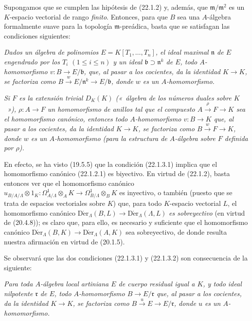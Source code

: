 \begin{remark}[22.1.3]
\label{0.22.1.3-fr}
Supongamos que se cumplen las hipótesis de (22.1.2) y, además, que
$\mathfrak m/\mathfrak m^2$ es un $K$-espacio vectorial de rango \emph{finito}.
Entonces, para que $B$ sea una $A$-álgebra formalmente suave para la topología
$\mathfrak m$-preádica, basta que se satisfagan las condiciones siguientes:

\begin{env}[22.1.3.1]
\label{0.22.1.3.1-fr}
\itshape Dados un álgebra de polinomios $E=K[T_1,\ldots,T_n]$, el ideal maximal
$\mathfrak n$ de $E$ engendrado por los $T_i$ $(1\leqslant i\leqslant n)$ y
un ideal $\mathfrak b\supset\mathfrak n^k$ de $E$, todo
$A$-homomorfismo $v:B\to E/\mathfrak b$, que, al pasar a los cocientes,
da la identidad $K\to K$, se factoriza como
$B\xrightarrow{w}E/\mathfrak n^k\to E/\mathfrak b$,
donde $w$ es un $A$-homomorfismo.
\end{env}

\begin{env}[22.1.3.2]
\label{0.22.1.3.2-fr}
\itshape Si $F$ es la extensión trivial $D_K(K)$ \textup{(«~álgebra de los números duales
sobre $K$~»)}, $\rho:A\to F$ un homomorfismo de anillos tal que el compuesto
$A\xrightarrow{\rho}F\to K$ sea el homomorfismo canónico, entonces todo
$A$-homomorfismo $v:B\to K$ que, al pasar a los cocientes, da la
identidad $K\to K$, se factoriza como
$B\xrightarrow{w}F\to K$,
donde $w$ es un $A$-homomorfismo (para la estructura de $A$-álgebra
sobre $F$ definida por $\rho$).
\end{env}

En efecto, se ha visto (19.5.5) que la condición (22.1.3.1) implica que el
homomorfismo canónico (22.1.2.1) es biyectivo. En virtud de (22.1.2), basta
entonces ver que el homomorfismo canónico
$u_{B/A/\Lambda}\otimes1_K:\Omega^1_{A/\Lambda}\otimes_AK\to\Omega^1_{B/\Lambda}\otimes_BK$
es inyectivo, o también (puesto que se trata de espacios vectoriales sobre
$K$) que, para todo $K$-espacio vectorial $L$, el homomorfismo canónico
$\operatorname{D\acute{e}r}_\Lambda(B,L)\to\operatorname{D\acute{e}r}_\Lambda(\Lambda,L)$ \emph{es
sobreyectivo} (en virtud de (20.4.8)); es claro que, para ello, es
necesario y suficiente que el homomorfismo canónico
$\operatorname{D\acute{e}r}_\Lambda(B,K)\to\operatorname{D\acute{e}r}_\Lambda(A,K)$ sea
sobreyectivo, de donde resulta nuestra afirmación en virtud de (20.1.5).

Se observará que las dos condiciones (22.1.3.1) y (22.1.3.2) son consecuencia
de la siguiente:

\begin{env}[22.1.3.3]
\label{0.22.1.3.3-fr}
\itshape Para toda $A$-álgebra local \textup{artiniana} $E$ de cuerpo residual \textup{igual a}
$K$, y todo ideal nilpotente $\mathfrak r$ de $E$, todo
$A$-homomorfismo $B\to E/\mathfrak r$ que, al pasar a los cocientes,
da la identidad $K\to K$, se factoriza como
$B\xrightarrow{u}E\to E/\mathfrak r$, donde $u$ es un
$A$-homomorfismo.
\end{env}
\end{remark}

